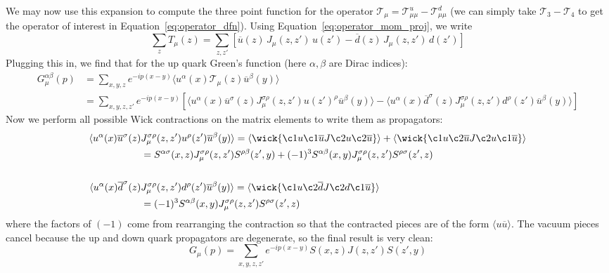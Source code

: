 \documentclass[11pt, oneside]{article}   	%
\theoremstyle{definition}
\begin{document}
We may now use this expansion to compute the three point function for the operator $\mathcal T_\mu = 
\mathcal T^u_{\mu\mu} - \mathcal T^d_{\mu\mu}$ (we can simply take $\mathcal T_3 - \mathcal T_4$ to get the operator of 
interest in Equation~\ref{eq:operator_dfn}). Using Equation~\ref{eq:operator_mom_proj}, we write 
\begin{equation}
	\sum_z T_\mu(z) = \sum_{z, z'}\left[\overline u(z)\, J_\mu(z, z')\, u(z') - \overline d(z)\, J_\mu(z, z')\, d(z')\right]
\end{equation}
Plugging this in, we find that for the up quark Green's function (here $\alpha, \beta$ are 
Dirac indices):
\begin{align}
	G_\mu^{\alpha\beta}(p) &= \sum_{x, y, z} e^{-ip(x - y)}\langle u^\alpha(x)\mathcal T_\mu(z) \overline u^\beta(y)\rangle \\
	&= \sum_{x, y, z, z'} e^{-ip(x - y)}\left[\langle u^\alpha(x)\overline u^\sigma(z) J_\mu^{\sigma\rho}(z, z') u(z')^\rho\overline 
	u^\beta(y)\rangle - \langle u^\alpha(x)\overline d^\sigma(z) J_\mu^{\sigma\rho}(z, z') d^\rho(z') \overline u^\beta(y)\rangle 
	\right]
\end{align}
Now we perform all possible Wick contractions on the matrix elements to write them as propagators:
\begin{align}
	\langle u^\alpha(x)\overline u^\sigma(z) &J_\mu^{\sigma\rho}(z, z') u^\rho(z')\overline u^\beta(y)\rangle = 
	\langle \wick{
		\c1 u \c1{\overline u} J \c2 u \c2{\overline u}
	} \rangle + \langle \wick{
		\c1 u \c2{\overline u} J \c2 u \c1{\overline u} 
	} \rangle \nonumber \\ 
	&= S^{\alpha\sigma}(x, z) J^{\sigma\rho}_\mu(z, z') S^{\rho\beta}(z', y) + (-1)^3 S^{\alpha\beta}(x, y) J^{\sigma\rho}_\mu(z, z')
	S^{\rho\sigma}(z', z) \\
	\nonumber\\
	\langle u^\alpha(x)\overline d^\sigma(z) &J_\mu^{\sigma\rho}(z, z') d^\rho(z') \overline u^\beta(y)\rangle = 
	\langle \wick{
		\c1 u \c2{\overline d} J \c2 d \c1{\overline u}
	}\rangle\nonumber \\ 
	&= (-1)^3 S^{\alpha\beta}(x, y) J^{\sigma\rho}_\mu(z, z')S^{\rho\sigma}(z', z)
\end{align}
where the factors of $(-1)$ come from rearranging the contraction so that the contracted pieces are of the form $\langle u\overline 
u\rangle$. The vacuum pieces cancel because the up and down quark propagators are degenerate, so the final result is very clean:
\begin{equation}
	G_\mu(p) = \sum_{x, y, z, z'}e^{-ip(x - y)} S(x, z) J(z, z') S(z', y)
\end{equation}
\end{document}
